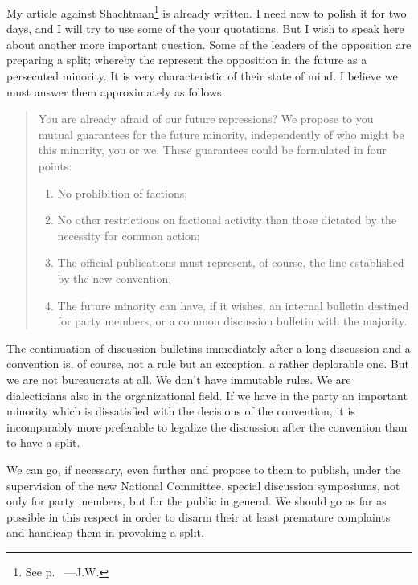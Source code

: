 

My article against Shachtman\footnote{See p.~\pageref{1940-01-24_from-a-scratch-to-the-danger-of-gangrene} ---J.W.} is already written. I need now to polish it for two days, and I will try to use some of the your quotations. But I wish to speak here about another more important question. Some of the leaders of the opposition are preparing a split; whereby the represent the opposition in the future as a persecuted minority. It is very characteristic of their state of mind. I believe we must answer them approximately as follows:

\begin{quote}
  You are already afraid of our future repressions? We propose to you mutual guarantees for the future minority, independently of who might be this minority, you or we. These guarantees could be formulated in four points:
  
  \begin{enumerate}
  	\item No prohibition of factions;
  	\item No other restrictions on factional activity than those dictated by the necessity for common action;
  	\item The official publications must represent, of course, the line established by the new convention;
  	\item The future minority can have, if it wishes, an internal bulletin destined for party members, or a common discussion bulletin with the majority.
  \end{enumerate}
\end{quote}

The continuation of discussion bulletins immediately after a long discussion and a convention is, of course, not a rule but an exception, a rather deplorable one. But we are not bureaucrats at all. We don’t have immutable rules. We are dialecticians also in the organizational field. If we have in the party an important minority which is dissatisfied with the decisions of the convention, it is incomparably more preferable to legalize the discussion after the convention than to have a split.

We can go, if necessary, even further and propose to them to publish, under the supervision of the new National Committee, special discussion symposiums, not only for party members, but for the public in general. We should go as far as possible in this respect in order to disarm their at least premature complaints and handicap them in provoking a split.


